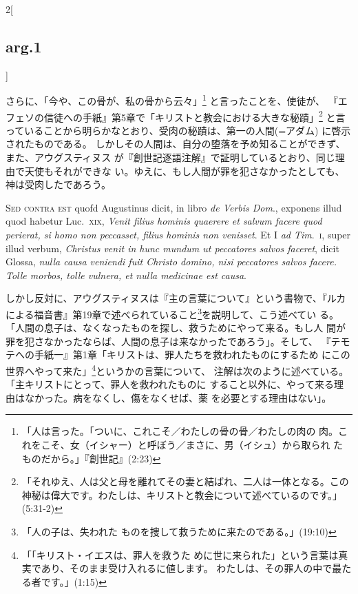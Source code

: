 \documentclass[paper=a4paper,fontsize=10pt,jafontsize=9pt,titlepage]{jlreq}
\begin{document}
\begin{paracol}{2}[\subsection{arg.1}]
\switchcolumn

さらに、「今や、この骨が、私の骨から云々」\footnote{「人は言った。「ついに、これこそ／わたしの骨の骨／わたしの肉の
 肉。これをこそ、女（イシャー）と呼ぼう／まさに、男（イシュ）から取られ
 たものだから。」『創世記』(2:23)}
と言ったことを、使徒が、
『エフェソの信徒への手紙』第5章で「キリストと教会における大きな秘蹟」\footnote{「それゆえ、人は父と母を離れてその妻と結ばれ、二人は一体となる。この神秘は偉大です。わたしは、キリストと教会について述べているのです。」(5:31-2)}
と言っていることから明らかなとおり、受肉の秘蹟は、第一の人間(=アダム)
に啓示されたものである。
しかしその人間は、自分の堕落を予め知ることができず、また、アウグスティヌス
 が『創世記逐語注解』で証明しているとおり、同じ理由で天使もそれができな
 い。ゆえに、もし人間が罪を犯さなかったとしても、神は受肉したであろう。

\switchcolumn*[\subsection{s.c.}]

{\scshape Sed contra est} quofd Augustinus dicit, in
libro {\itshape de Verbis Dom}., exponens illud quod habetur Luc.~{\scshape xix}, {\itshape Venit filius
hominis quaerere et salvum facere quod perierat, si homo non peccasset,
filius hominis non venisset}. Et I {\itshape ad Tim}.~{\scshape i}, super illud verbum,
{\itshape Christus venit in hunc mundum ut peccatores salvos faceret}, dicit
Glossa, {\itshape nulla causa veniendi fuit Christo domino, nisi peccatores salvos
facere. Tolle morbos, tolle vulnera, et nulla medicinae est causa}.

\switchcolumn

しかし反対に、アウグスティヌスは『主の言葉について』という書物で、『ルカ
 による福音書』第19章で述べられていること\footnote{「人の子は、失われた
 ものを捜して救うために来たのである。」(19:10)}を説明して、こう述べてい
 る。「人間の息子は、なくなったものを探し、救うためにやって来る。もし人
 間が罪を犯さなかったならば、人間の息子は来なかったであろう」。そして、
 『テモテへの手紙一』第1章「キリストは、罪人たちを救われたものにするため
 にこの世界へやって来た」\footnote{「「キリスト・イエスは、罪人を救うた
 めに世に来られた」という言葉は真実であり、そのまま受け入れるに値します。
 わたしは、その罪人の中で最たる者です。」(1:15)}というかの言葉について、
 注解は次のように述べている。「主キリストにとって、罪人を救われたものに
 すること以外に、やって来る理由はなかった。病をなくし、傷をなくせば、薬
 を必要とする理由はない」。


\end{paracol}
\end{document}
